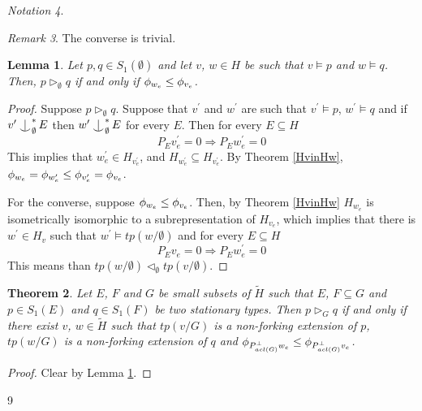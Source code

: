 \documentclass{amsart}
\newtheorem{theo}{Theorem}[section]
\newtheorem{lemma}[theo]{Lemma}
\theoremstyle{definition}
\theoremstyle{remark}
\newtheorem{rem}[theo]{Remark}
\newtheorem{nota}[theo]{Notation}
\begin{document}
\begin{nota}
\begin{rem}
The converse is trivial.
\epf

\begin{lemma}\label{dominationoverempty}
Let $p,q\in S_1(\emptyset)$ and let $v$, $w\in H$ be such that $v\models p$ and $w\models q$.
Then, $p\vartriangleright_\emptyset q$ if and only if $\phi_{w_e}\leq\phi_{v_e}$.
\end{lemma}
\begin{proof}
Suppose $p\vartriangleright_\emptyset q$. Suppose that $v^\prime$ and $w^\prime$ are such that $v^\prime\models p$, $w^ \prime\models q$ and if $v^\prime\ind^*_\emptyset E$ then $w^\prime\ind_\emptyset^*E$ for every $E$. Then for every $E\subseteq H$
\[P_Ev^\prime_e=0\Rightarrow P_Ew^\prime_e=0\]
This implies that $w^\prime_e\in H_{v^\prime_e}$, and $H_{w^\prime_e}\subseteq H_{v^\prime_e}$. By Theorem \ref{HvinHw}, $\phi_{w_e}=\phi_{w^\prime_e}\leq\phi_{v^\prime_e}=\phi_{v_e}$.

For the converse, suppose $\phi_{w_e}\leq\phi_{v_e}$. Then, by Theorem \ref{HvinHw} $H_{w_e}$ is isometrically isomorphic to a subrepresentation of $H_{v_e}$, which implies that there is $w^\prime\in H_v$ such that $w^\prime\models tp(w/\emptyset)$ and for every $E\subseteq H$
\[P_Ev_e=0\Rightarrow P_Ew^\prime_e=0\]
This means than $tp(w/\emptyset)\vartriangleleft_\emptyset tp(v/\emptyset)$.
\end{proof}

\begin{theo}\label{dominationoverA}
Let $E$, $F$ and $G$ be small subsets of $\tilde{H}$ such that $E$, $F\subseteq G$ and $p\in S_1(E)$ and $q\in S_1(F)$ be two stationary types. Then $p\vartriangleright_G q$ if and only if there exist $v$, $w\in\tilde{H}$ such that $tp(v/G)$ is a non-forking extension of $p$, $tp(w/G)$ is a non-forking extension of $q$ and $\phi_{P^\perp_{acl(G)}w_e}\leq\phi_{P^\perp_{acl(G)}v_e}$.
\end{theo}
\begin{proof}
Clear by Lemma \ref{dominationoverempty}.
\end{proof}




\begin{thebibliography}{9}


\end{thebibliography}
\end{rem}
\end{nota}
\end{document}
